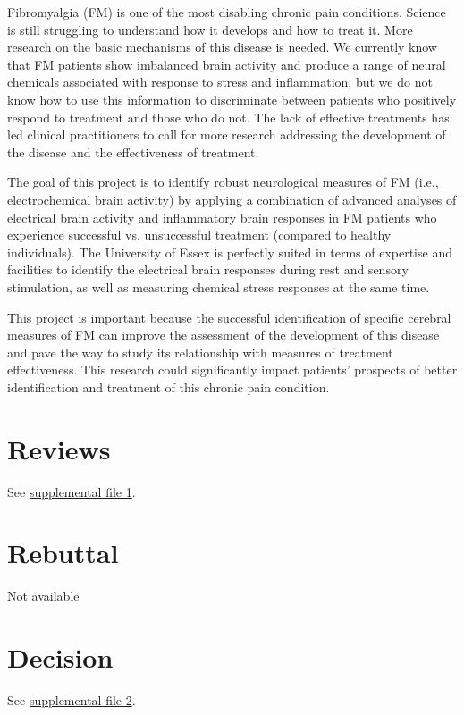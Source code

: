\documentclass[twocolumn, serif, rga, numeric]{jote-article}
\begin{document}
Fibromyalgia (FM) is one of the most disabling chronic pain conditions.
Science is still struggling to understand how it develops and how to
treat it. More research on the basic mechanisms of this disease is
needed. We currently know that FM patients show imbalanced brain
activity and produce a range of neural chemicals associated with
response to stress and inflammation, but we do not know how to use this
information to discriminate between patients who positively respond to
treatment and those who do not. The lack of effective treatments has led
clinical practitioners to call for more research addressing the
development of the disease and the effectiveness of treatment.

The goal of this project is to identify robust neurological measures of
FM (i.e., electrochemical brain activity) by applying a combination of
advanced analyses of electrical brain activity and inflammatory brain
responses in FM patients who experience successful vs. unsuccessful
treatment (compared to healthy individuals). The University of Essex is
perfectly suited in terms of expertise and facilities to identify the
electrical brain responses during rest and sensory stimulation, as well
as measuring chemical stress responses at the same time.

This project is important because the successful identification of
specific cerebral measures of FM can improve the assessment of the
development of this disease and pave the way to study its relationship
with measures of treatment effectiveness. This research could
significantly impact patients' prospects of better identification and
treatment of this chronic pain condition.

\newpage
\section*{Reviews}


See \href{https://jtrialerror.com/assets/supplements/rga5/Valentini-Reviewers-Comments.pdf}{supplemental file 1}.
\vspace*{-.5\baselineskip}
\section*{Rebuttal}

Not available

\vspace*{-.5\baselineskip}
\section*{Decision}


See \href{https://jtrialerror.com/assets/supplements/rga5/Valentini-Decision.pdf}{supplemental file 2}.


\nocite{*}

\printbibliography

\newpage
\license
\end{document}
